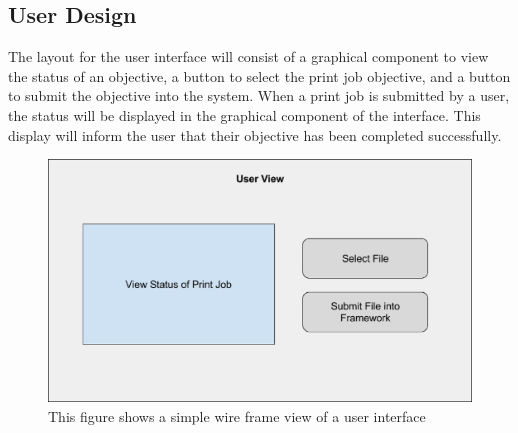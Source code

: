 \documentclass[draftclsnofoot, onecolumn, compsoc, 10pt]{IEEEtran}
\begin{document}
\subsection{User Design}
The layout for the user interface will consist of a graphical component to view the status of an objective, a button to select the print job objective, and a button to submit the objective into the system. When a print job is submitted by a user, the status will be displayed in the graphical component of the interface. This display will inform the user that their objective has been completed successfully. 
\begin{figure}[H]
\centering
\includegraphics[scale=0.4]{user}
\captionsetup{justification=centering}
\caption{This figure shows a simple wire frame view of a user interface}
\end{figure}
\end{document}
